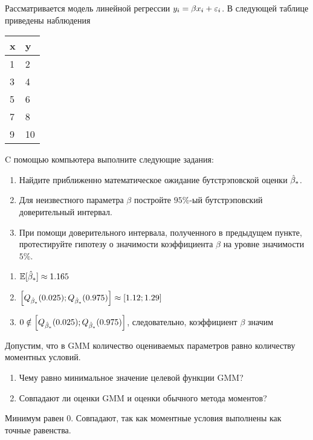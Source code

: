 \begin{problem}
Рассматривается модель линейной регрессии $y_i = \beta x_i + \varepsilon_i$. В следующей таблице приведены наблюдения

\begin{tabular}{ll}
\toprule
x & y \\
\midrule
1 & 2 \\
3 & 4 \\
5 & 6 \\
7 & 8 \\
9 & 10\\
\bottomrule
\end{tabular}
C помощью компьютера выполните следующие задания:

\begin{enumerate}
\item Найдите приближенно математическое ожидание бутстрэповской оценки $\hat{\beta}_*$.
\item Для неизвестного параметра $\beta$ постройте $95\%$-ый бутстрэповский доверительный интервал.
\item При помощи доверительного интервала, полученного в предыдущем пункте, протестируйте гипотезу о значимости коэффициента $\beta$ на уровне значимости $5\%$.
\end{enumerate}


\begin{sol}
\begin{enumerate}
\item $\mathbb{E} [\hat{\beta}_*] \approx 1.165 $
\item $\left[ Q_{\hat{\beta}_*} (0.025);  Q_{\hat{\beta}_*} (0.975) \right] \approx \left[1.12; 1.29 \right] $
\item $0 \notin  \left[ Q_{\hat{\beta}_*} (0.025);  Q_{\hat{\beta}_*} (0.975) \right]$, следовательно, коэффициент $\beta$ значим
\end{enumerate}
\end{sol}
\end{problem}

\begin{problem}
  Допустим, что в GMM количество оцениваемых параметров равно количеству моментных условий.
  \begin{enumerate}
    \item Чему равно минимальное значение целевой функции GMM?
    \item Совпадают ли оценки GMM и оценки обычного метода моментов?
  \end{enumerate}

\begin{sol}
Минимум равен $0$. Совпадают, так как моментные условия выполнены как точные равенства.
\end{sol}
\end{problem}


